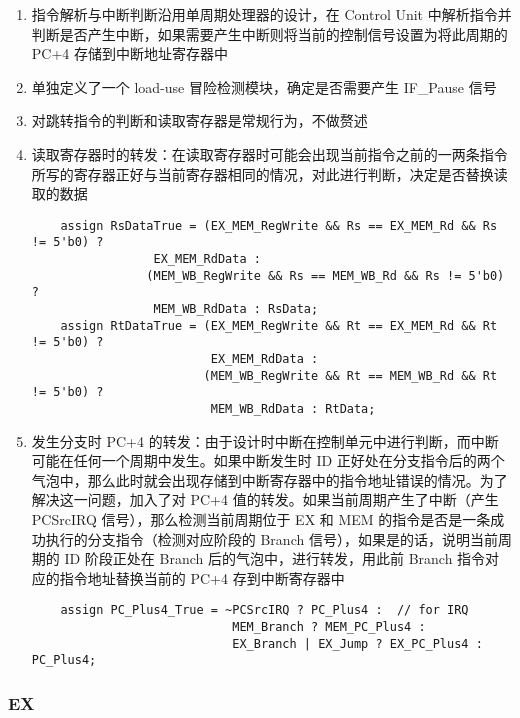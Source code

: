 \documentclass[a4paper]{article}
\begin{document}
\begin{enumerate}
  \item 指令解析与中断判断沿用单周期处理器的设计，在 Control Unit 中解析指令并判断是否产生中断，如果需要产生中断则将当前的控制信号设置为将此周期的 PC+4 存储到中断地址寄存器中
  \item 单独定义了一个 load-use 冒险检测模块，确定是否需要产生 IF\_Pause 信号
  \item 对跳转指令的判断和读取寄存器是常规行为，不做赘述
  \item 读取寄存器时的转发：在读取寄存器时可能会出现当前指令之前的一两条指令所写的寄存器正好与当前寄存器相同的情况，对此进行判断，决定是否替换读取的数据

  \begin{verbatim}
    assign RsDataTrue = (EX_MEM_RegWrite && Rs == EX_MEM_Rd && Rs != 5'b0) ?
                 EX_MEM_RdData :
                (MEM_WB_RegWrite && Rs == MEM_WB_Rd && Rs != 5'b0) ?
                 MEM_WB_RdData : RsData;
    assign RtDataTrue = (EX_MEM_RegWrite && Rt == EX_MEM_Rd && Rt != 5'b0) ?
                         EX_MEM_RdData :
                        (MEM_WB_RegWrite && Rt == MEM_WB_Rd && Rt != 5'b0) ?
                         MEM_WB_RdData : RtData;
  \end{verbatim}

  \item 发生分支时 PC+4 的转发：由于设计时中断在控制单元中进行判断，而中断可能在任何一个周期中发生。如果中断发生时 ID 正好处在分支指令后的两个气泡中，那么此时就会出现存储到中断寄存器中的指令地址错误的情况。为了解决这一问题，加入了对 PC+4 值的转发。如果当前周期产生了中断（产生 PCSrcIRQ 信号），那么检测当前周期位于 EX 和 MEM 的指令是否是一条成功执行的分支指令（检测对应阶段的 Branch 信号），如果是的话，说明当前周期的 ID 阶段正处在 Branch 后的气泡中，进行转发，用此前 Branch 指令对应的指令地址替换当前的 PC+4 存到中断寄存器中

  \begin{verbatim}
    assign PC_Plus4_True = ~PCSrcIRQ ? PC_Plus4 :  // for IRQ
                            MEM_Branch ? MEM_PC_Plus4 :
                            EX_Branch | EX_Jump ? EX_PC_Plus4 : PC_Plus4;
  \end{verbatim}
\end{enumerate}

\subsubsection{EX}
\label{subs:EX}
\end{document}
